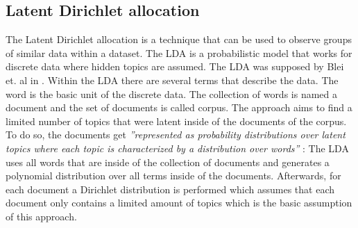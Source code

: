 \subsection{Latent Dirichlet allocation} %
\label{sub:lda}


The Latent Dirichlet allocation is a technique that can be used to observe groups of similar data within a dataset. The LDA is a probabilistic model that works for discrete data where hidden topics are assumed. The LDA was supposed by Blei et. al in \cite{blei_latent_nodate}.
Within the LDA there are several terms that describe the data. The word is the basic unit of the discrete data. The collection of words is named a document and the set of documents is called corpus.
The approach aims to find a limited number of topics that were latent inside of the documents of the corpus. To do so, the documents get \textit{''represented as probability distributions over latent topics where each topic is characterized  by a distribution over words''} \cite{niu_topic2vec_2015}:
The LDA uses all words that are inside of the collection of documents and generates a polynomial distribution over all terms inside of the documents. Afterwards, for each document a Dirichlet distribution is performed which assumes that each document only contains a limited amount of topics which is the basic assumption of this approach.
